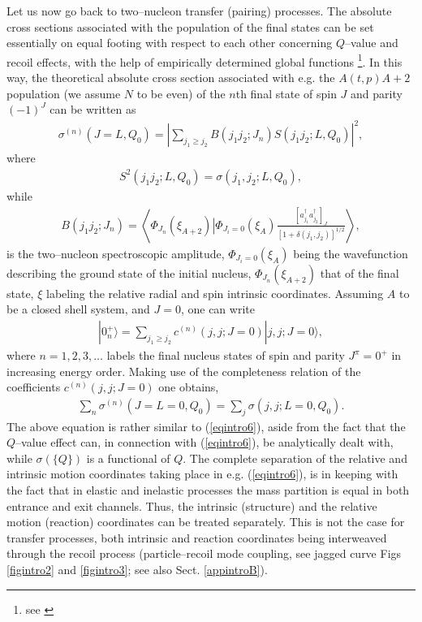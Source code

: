 Let us now go back to two--nucleon transfer (pairing) processes. The  absolute cross sections associated with the population of the final states can be set essentially on equal footing with respect to each other  concerning  $Q$--value and recoil effects, with the help of empirically determined global functions \footnote{see \cite{Broglia:72b}}. In this way, the theoretical absolute cross section associated with e.g. the $A(t,p)A+2$ population (we assume $N$ to be even) of the $n$th final state of spin $J$ and parity $(-1)^J$ can be written as 
\begin{align}
\sigma^{(n)}(J=L,Q_0)=\left|\sum_{j_1\geq j_2}B(j_1 j_2;J_n)S(j_1 j_2 ;L,Q_0)\right|^2,
\end{align}
where
\begin{align}
S^2(j_1 j_2 ;L,Q_0)=\sigma(j_1,j_2;L,Q_0),
\end{align}
while
\begin{align}
B(j_1j_2;J_n)=\left\langle \Phi_{J_n}(\xi_{A+2})\left|\Phi_{J_i=0}(\xi_A)\right.\frac{\left[a^\dagger_{j_1}a^\dagger_{j_2}\right]_J}{\left[1+\delta(j_1,j_2)\right]^{1/2}}\right\rangle,
\end{align}
is the two--nucleon spectroscopic amplitude, $\Phi_{J_i=0}(\xi_A)$ being the wavefunction describing the ground state of the initial nucleus, $\Phi_{J_n}(\xi_{A+2})$ that of the final state, $\xi$ labeling the relative radial and spin intrinsic coordinates. Assuming $A$ to be a closed shell system, and $J=0$, one can write
\begin{align}
|0^+_n\rangle=\sum_{j_1\geq j_2}c^{(n)}(j,j;J=0)|j,j;J=0\rangle,
\end{align}
where $n=1,2,3,\dots$ labels the final nucleus states of spin and parity $J^\pi=0^+$ in increasing energy order. Making use of the completeness relation of the coefficients $c^{(n)}(j,j;J=0)$ one obtains,
\begin{align}\label{eqintro12}
\sum_n \sigma^{(n)}(J=L=0,Q_0)=\sum_j\sigma(j,j;L=0,Q_0).
\end{align}
The above equation is rather similar to (\ref{eqintro6}), aside from the fact that the $Q$--value effect can, in connection with (\ref{eqintro6}),  be analytically dealt with, while $\sigma(\{Q\})$ is a functional of $Q$. The complete separation of the relative and intrinsic motion coordinates taking place in e.g. (\ref{eqintro6}), is in keeping with the fact that in elastic and inelastic processes the mass partition is equal in both entrance and exit channels. Thus, the intrinsic (structure) and the relative motion (reaction) coordinates can be treated separately. This is not the case for transfer processes, both intrinsic and reaction coordinates being interweaved through the recoil process (particle--recoil mode coupling, see jagged curve Figs \ref{figintro2} and \ref{figintro3}; see also Sect. \ref{appintroB}). 





